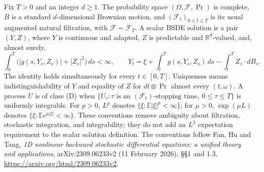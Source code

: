 \documentclass[11pt,a4paper]{article}
\newcommand{\R}{\mathbb R}
\newcommand{\E}{\mathbb E}
\begin{document}
Fix $T>0$ and an integer $d\geq1$. The probability space
$(\Omega,\mathcal F,\Pr)$ is complete, $B$ is a standard $d$-dimensional
Brownian motion, and $(\mathcal F_t)_{0\leq t\leq T}$ is its usual augmented
natural filtration, with $\mathcal F=\mathcal F_T$. A scalar BSDE solution
is a pair $(Y,Z)$, where $Y$ is continuous and adapted, $Z$ is predictable
and $\R^d$-valued, and, almost surely,
\[
 \int_0^T\bigl(|g(s,Y_s,Z_s)|+|Z_s|^2\bigr)\,ds<\infty,
 \qquad
 Y_t=\xi+\int_t^T g(s,Y_s,Z_s)\,ds-\int_t^T Z_s\cdot dB_s.
\]
The identity holds simultaneously for every $t\in[0,T]$. Uniqueness means
indistinguishability of $Y$ and equality of $Z$ for $dt\otimes\Pr$ almost
every $(t,\omega)$. A process $U$ is of class (D) when
$\{U_\tau:\tau\text{ is an }(\mathcal F_t)\text{-stopping time},\ 0\leq\tau\leq T\}$
is uniformly integrable. For $p>0$, $L^p$ denotes
$\{\xi:\E|\xi|^p<\infty\}$; for $\mu>0$,
$\exp(\mu L)$ denotes $\{\xi:\E e^{\mu|\xi|}<\infty\}$.
These conventions remove ambiguity about filtration, stochastic integration,
and integrability; they do not add an $L^2$ expectation requirement to the
scalar solution definition. The conventions follow Fan, Hu and Tang,
\emph{1D nonlinear backward stochastic differential equations: a unified
theory and applications}, arXiv:2309.06233v2 (11 February 2026),
\S\S1 and 1.3, \url{https://arxiv.org/html/2309.06233v2}.
\end{document}
